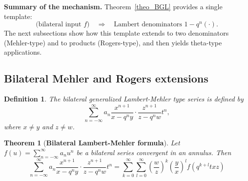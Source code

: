 \documentclass[12pt]{article}
\newtheorem{theorem}{Theorem}
\newtheorem{definition}{Definition}
\begin{document}
\medskip
\noindent\textbf{Summary of the mechanism.}
Theorem~\ref{theo_BGL} provides a single template:
\[
\text{(bilateral input \(f\))} \quad \Longrightarrow \quad
\text{Lambert denominators \(1-q^n(\cdot)\)}.
\]
The next subsections show how this template extends to two denominators
(Mehler-type) and to products (Rogers-type), and then yields theta-type applications.

\subsection{Bilateral Mehler and Rogers extensions}

\begin{definition}
The bilateral generalized Lambert-Mehler type series is defined by
\begin{equation}
    \sum_{n=-\infty}^{\infty}a_{n}\frac{x^{n+1}}{x-q^ny}\cdot\frac{z^{n+1}}{z-q^nw}t^n,
\end{equation}
where $x\neq y$ and $z\neq w$.
\end{definition}

\begin{theorem}[{\bf Bilateral Lambert-Mehler formula}]\label{bimehler}
Let $f(u) = \sum_{n=-\infty}^{\infty}a_nu^n$ be a bilateral series convergent in an annulus. Then
    \begin{equation}
        \sum_{n=-\infty}^{\infty}a_{n}\frac{x^{n+1}}{x-q^ny}\cdot\frac{z^{n+1}}{z-q^nw}t^n=\sum_{k=0}^{\infty}\sum_{l=0}^{\infty}\left(\frac{w}{z}\right)^k\left(\frac{y}{x}\right)^lf(q^{k+l}txz)
    \end{equation}
\end{theorem}
\end{document}

